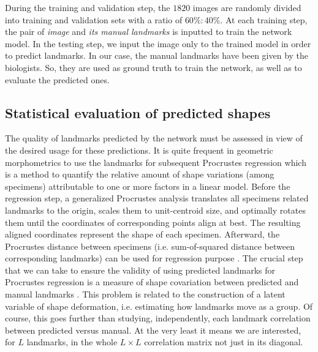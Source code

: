 \documentclass[review]{elsarticle}
\begin{document}
During the training and validation step, the $1820$ images are randomly divided into training and validation sets with a ratio of $60\%:40\%$. At each training step, the pair of \textit{image} and
\textit{its manual landmarks} is inputted to train the network
model. In the testing step, we input the image only to the trained
model in order to predict landmarks. In our case, the manual landmarks have
been given by the biologists. So, they are used as ground truth to
train the network, as well as to evaluate the predicted ones.

\subsection{Statistical evaluation of predicted shapes}
\label{subsec24}
The quality of landmarks predicted by the network must be assessed in view of the desired usage for these predictions. It is quite frequent in geometric morphometrics to use the landmarks for subsequent Procrustes regression \cite{adams_geomorph_2013} which is a method to quantify the relative amount of shape variations (among specimens) attributable to one or more factors in a linear model. 
Before the regression step, a generalized Procrustes analysis \cite{adams_geomorph_2013} translates all specimens related landmarks to the origin, scales them to unit-centroid size, and optimally rotates them until the coordinates of corresponding points align at best. The resulting aligned coordinates represent the shape of each specimen. Afterward, the Procrustes distance between specimens (i.e. sum-of-squared distance between corresponding landmarks) can be used for regression purpose \cite{goodall_procrustes_1991}. 
The crucial step that we can take to ensure the validity of using predicted landmarks for Procrustes regression is a measure of shape covariation between predicted and manual landmarks \cite{rohlf_use_2000}. 
This problem is related to the construction of a latent variable of
shape deformation, i.e. estimating how landmarks move as a group. Of course, this goes further than studying, independently, each landmark correlation between predicted versus manual. At the very least it means we are interested, for $L$ landmarks, in the whole $L \times L$ correlation matrix not just in its diagonal.
\end{document}
